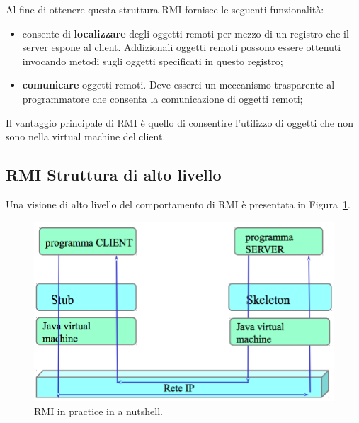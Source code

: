 \documentclass{article}
\begin{document}
Al fine di ottenere questa struttura RMI fornisce le seguenti funzionalit\`a:
\begin{itemize}
\item consente di \textbf{localizzare} degli oggetti remoti per mezzo di un registro che il server espone al client. Addizionali oggetti remoti possono essere ottenuti invocando metodi sugli oggetti specificati in questo registro;
\item \textbf{comunicare} oggetti remoti. Deve esserci un meccanismo trasparente al programmatore che consenta la comunicazione di oggetti remoti;
\end{itemize}

Il vantaggio principale di RMI \`e quello di consentire l'utilizzo di oggetti che non sono nella virtual machine del client. 

\subsection{RMI Struttura di alto livello}
Una visione di alto livello del comportamento di RMI \`e presentata in Figura~\ref{RMIInPracticeHighLevel}. 

\begin{figure}[h]
\centering
\includegraphics[scale=0.3]{Img/RMIInternal.png}
\centering
\caption{RMI in practice in a nutshell.}
\label{RMIInPracticeHighLevel}
\end{figure}
\end{document}
